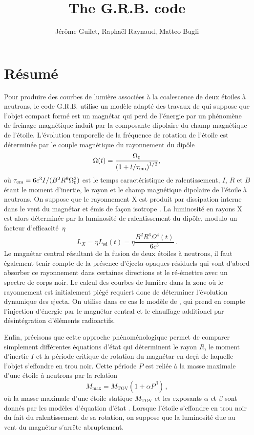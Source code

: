 \documentclass[11pt]{article} %
\title{The G.R.B. code}
\author{J\'er\^ome Guilet, Rapha\"el Raynaud, Matteo Bugli}
\newcommand{\tx}[1]{\textrm{#1}}
\begin{document}
\maketitle

\section{Résumé}
Pour produire des courbes de lumière associées à la coalescence de
deux étoiles à neutrons, le code G.R.B.  utilise un modèle adapté des
travaux de \citet{sun2017} qui suppose que l'objet compact formé est
un magnétar qui perd de l'énergie par un phénomène de freinage
magnétique induit par la composante dipolaire du champ magnétique de
l'étoile. L'évolution temporelle de la fréquence de rotation de
l'étoile est déterminée par le couple magnétique du rayonnement du
dipôle
\begin{equation}
\Omega(t) = \frac{\Omega_0}{\left(1 + t/\tau_{\rm em}\right)^{1/2}},
\end{equation}
où $\tau_{\rm em} = 6c^3 I/(B^2 R^6 \Omega_0^2) $ est le temps
caractéristique de ralentissement, $I$, $R$ et $B$ étant le moment
d'inertie, le rayon et le champ magnétique dipolaire de l'étoile à
neutrons. On suppose que le rayonnement X est produit par dissipation
interne dans le vent du magnétar et émis de façon isotrope
\citep{zhang2013}. La luminosité en rayons X est alors déterminée par
la luminosité de ralentissement du dipôle, modulo un facteur
d'efficacité~$\eta$
\begin{equation}
  L_X = \eta L_\tx{sd}(t) = \eta \frac{B^2 R^6 \Omega^4(t)}{6 c^3}
  \,.
\end{equation}
Le magnétar central résultant de la fusion de deux étoiles à neutrons,
il faut également tenir compte de la présence d'éjecta opaques
résiduels qui vont d'abord absorber ce rayonnement dans certaines
directions et le ré-émettre avec un spectre de corps noir. Le calcul
des courbes de lumière dans la zone où le rayonnement est initialement
piégé requiert donc de déterminer l'évolution dynamique des ejecta. On
utilise dans ce cas le modèle de \citet{yu2013}, qui prend en compte
l'injection d'énergie par le magnétar central et le chauffage
additionel par désintégration d'éléments radioactifs.

Enfin, précisons que cette approche phénoménologique permet de
comparer simplement différentes équations d'état qui déterminent le
rayon $R$, le moment d'inertie $I$ et la période critique de rotation
du magnétar en deçà de laquelle l'objet s'effondre en trou noir. Cette
période $P$ est reliée à la masse maximale d'une étoile à neutrons par
la relation \citep{lasky2014}
\begin{equation}
  M_\tx{max} = M_\tx{TOV} (1+ \alpha P^\beta)
  \,,
\end{equation}
où la masse maximale d'une étoile statique $M_\text{TOV}$ et les
exposants $\alpha$ et $\beta$ sont donnés par les modèles d'équation
d'état \citep{ai2018}. Lorsque l'étoile s'effondre en trou noir du
fait du ralentissement de sa rotation, on suppose que la luminosité
due au vent du magnétar s'arrête abruptement.
\end{document}
